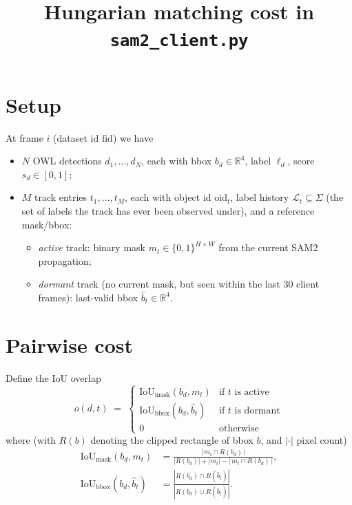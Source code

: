 \documentclass[11pt]{article}
\title{Hungarian matching cost in \texttt{sam2\_client.py}}
\author{}
\date{}
\begin{document}
\maketitle

\section*{Setup}
At frame $i$ (dataset id $\text{fid}$) we have
\begin{itemize}
  \item $N$ OWL detections $d_1,\ldots,d_N$, each with bbox $b_d \in \mathbb{R}^4$,
        label $\ell_d$, score $s_d \in [0,1]$;
  \item $M$ track entries $t_1,\ldots,t_M$, each with object id $\text{oid}_t$, label
        history $\mathcal{L}_t \subseteq \Sigma$ (the set of labels the track has ever been
        observed under), and a reference mask/bbox:
        \begin{itemize}
            \item \emph{active} track: binary mask $m_t \in \{0,1\}^{H\times W}$ from
                  the current SAM2 propagation;
            \item \emph{dormant} track (no current mask, but seen within the last
                  30 client frames): last-valid bbox $\hat b_t \in \mathbb{R}^4$.
        \end{itemize}
\end{itemize}

\section*{Pairwise cost}
Define the IoU overlap
\begin{equation}
    o(d, t) \;=\;
    \begin{cases}
        \mathrm{IoU}_{\text{mask}}(b_d, m_t) & \text{if $t$ is active} \\[2pt]
        \mathrm{IoU}_{\text{bbox}}(b_d, \hat b_t) & \text{if $t$ is dormant} \\[2pt]
        0 & \text{otherwise}
    \end{cases}
\end{equation}
where (with $R(b)$ denoting the clipped rectangle of bbox $b$, and $|\cdot|$
pixel count)
\begin{align}
    \mathrm{IoU}_{\text{mask}}(b_d, m_t) &=
        \frac{\big|\,m_t \cap R(b_d)\,\big|}
             {|R(b_d)| + |m_t| - |\,m_t \cap R(b_d)\,|}, \\[4pt]
    \mathrm{IoU}_{\text{bbox}}(b_d, \hat b_t) &=
        \frac{|R(b_d) \cap R(\hat b_t)|}{|R(b_d) \cup R(\hat b_t)|}.
\end{align}
\end{document}
